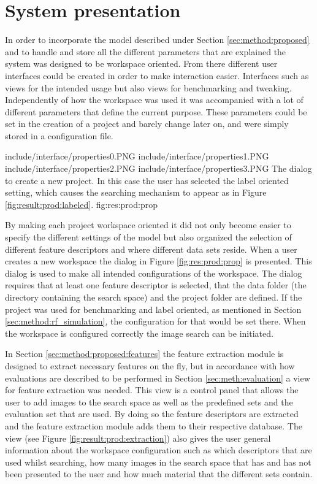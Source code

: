 
\section{System presentation}
\label{sec:res:prod}
In order to incorporate the model described under Section \ref{sec:method:proposed} and to handle and store all the different parameters that are explained the system was designed to be workspace oriented. From there different user interfaces could be created in order to make interaction easier. Interfaces such as views for the intended usage but also views for benchmarking and tweaking. Independently of how the workspace was used it was accompanied with a lot of different parameters that define the current purpose. These parameters could be set in the creation of a project and barely change later on, and were simply stored in a configuration file. 

\quadfigure
{include/interface/properties0.PNG}
{include/interface/properties1.PNG}
{include/interface/properties2.PNG}
{include/interface/properties3.PNG}
{The dialog to create a new project. In this case the user has selected the label oriented setting, which causes the searching mechanism to appear as in Figure \ref{fig:result:prod:labeled}.}
{fig:res:prod:prop}

By making each project workspace oriented it did not only become easier to specify the different settings of the model but also organized the selection of different feature descriptors and where different data sets reside. When a user creates a new workspace the dialog in Figure \ref{fig:res:prod:prop} is presented. This dialog is used to make all intended configurations of the workspace. The dialog requires that at least one feature descriptor is selected, that the data folder (the directory containing the search space) and the project folder are defined. If the project was used for benchmarking and label oriented, as mentioned in Section \ref{sec:method:rf_simulation}, the configuration for that would be set there. When the workspace is configured correctly the image search can be initiated. 

In Section \ref{sec:method:proposed:features} the feature extraction module is designed to extract necessary features on the fly, but in accordance with how evaluations are described to be performed in Section \ref{sec:meth:evaluation} a view for feature extraction was needed. This view is a control panel that allows the user to add images to the search space as well as the predefined sets and the evaluation set that are used. By doing so the feature descriptors are extracted and the feature extraction module adds them to their respective database. The view (see Figure \ref{fig:result:prod:extraction}) also gives the user general information about the workspace configuration such as which descriptors that are used whilst searching, how many images in the search space that has and has not been presented to the user and how much material that the different sets contain.

